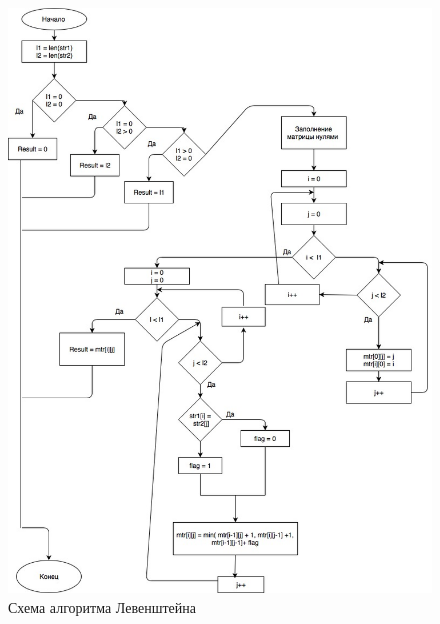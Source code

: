 \documentclass[12pt]{article}
\begin{document}
\begin{figure}[ht!]
\centering
\includegraphics[width=120mm]{levenstein-2.jpg}
\caption{Схема алгоритма Левенштейна  \label{overflow}}
\end{figure}

\newpage
\newpage
\end{document}
